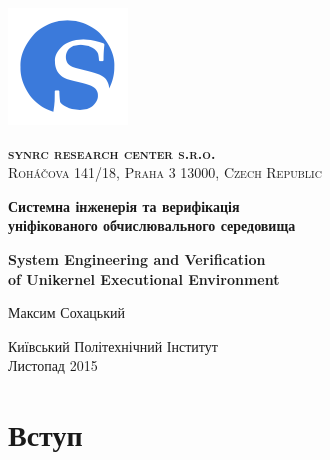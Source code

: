 \documentclass[11pt,oneside]{article}
\begin{document}
\thispagestyle{empty}
\begin{center}

\begin{minipage}[t]{2cm}
    \includegraphics[scale=0.4]{img/S}
\end{minipage}
\begin{minipage}[t]{12cm}
    \begin{flushright}
        \textsc{{\Large {\bf {\color{Blue}syn}{\color{OrangeRed}rc} research center s.r.o.}}}\\
        \textsc{Roháčova 141/18, Praha 3 13000, Czech Republic}\\
    \end{flushright}
\end{minipage}

\vspace{3cm}

    \vspace{3cm}   {\Large \bf Системна інженерія та верифікація\\ \vspace{0.2cm} уніфікованого обчислювального середовища}\par
    \vspace{1cm}   {\Large \bf System Engineering and Verification\\ \vspace{0.2cm} of Unikernel Executional Environment}\par
    \vspace{3cm}   {\Large Максим Сохацький\par}
    \vspace{4cm}   {\Large Київський Політехнічний Інститут\\}
    \vspace{0.3cm} {\Large Листопад 2015}

\end{center}

\vspace{2cm}
\newpage
\section{Вступ}

\vspace{1cm}
\end{document}

